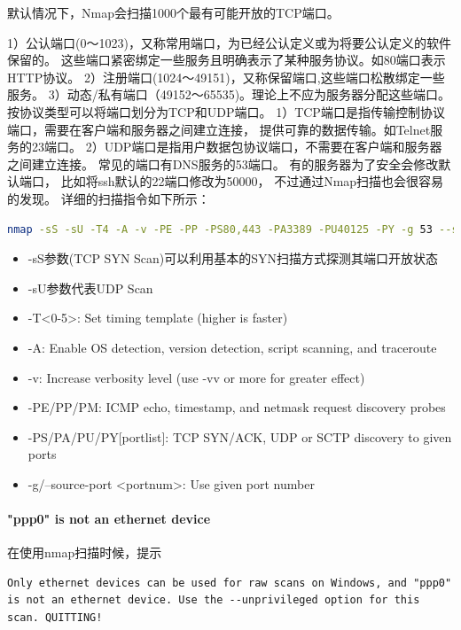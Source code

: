 \documentclass{book}
\begin{document}
默认情况下，Nmap会扫描1000个最有可能开放的TCP端口。

1）公认端口(0～1023)，又称常用端口，为已经公认定义或为将要公认定义的软件保留的。
这些端口紧密绑定一些服务且明确表示了某种服务协议。如80端口表示HTTP协议。
2）注册端口(1024～49151)，又称保留端口,这些端口松散绑定一些服务。
3）动态/私有端口（49152～65535)。理论上不应为服务器分配这些端口。
按协议类型可以将端口划分为TCP和UDP端口。
1）TCP端口是指传输控制协议端口，需要在客户端和服务器之间建立连接，
提供可靠的数据传输。如Telnet服务的23端口。
2）UDP端口是指用户数据包协议端口，不需要在客户端和服务器之间建立连接。
常见的端口有DNS服务的53端口。
有的服务器为了安全会修改默认端口，
比如将ssh默认的22端口修改为50000，
不过通过Nmap扫描也会很容易的发现。
详细的扫描指令如下所示：

\begin{lstlisting}[language=Bash]
nmap -sS -sU -T4 -A -v -PE -PP -PS80,443 -PA3389 -PU40125 -PY -g 53 --script "default or (discovery and safe)" 12.26.32.14 
\end{lstlisting}

\begin{itemize}
	\item{-sS参数(TCP SYN Scan)可以利用基本的SYN扫描方式探测其端口开放状态}
	\item{-sU参数代表UDP Scan}
	\item{-T<0-5>: Set timing template (higher is faster)}
	\item{-A: Enable OS detection, version detection, script scanning, and traceroute}
	\item{-v: Increase verbosity level (use -vv or more for greater effect)}
	\item{-PE/PP/PM: ICMP echo, timestamp, and netmask request discovery probes}
	\item{-PS/PA/PU/PY[portlist]: TCP SYN/ACK, UDP or SCTP discovery to given ports}
	\item{-g/--source-port <portnum>: Use given port number}
\end{itemize}


\paragraph{"ppp0" is not an ethernet device}在使用nmap扫描时候，提示 

\begin{lstlisting}
Only ethernet devices can be used for raw scans on Windows, and "ppp0" is not an ethernet device. Use the --unprivileged option for this scan. QUITTING!
\end{lstlisting}
\end{document}
